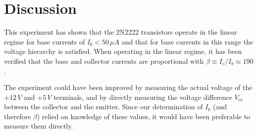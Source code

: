 \documentclass[aps,prl,twocolumn,groupedaddress]{revtex4}
\begin{document}
\section{Discussion}

This experiment has shown that the 2N2222 transistors operate in the linear regime for base currents of $I_b < 50 \, \mu A$ and that for base currents in this range the voltage hierarchy is satisfied.  When operating in the linear regime, it has been verified that the base and collector currents are proportional with $\beta \equiv I_c/I_b \approx 190$.  

The experiment could have been improved by measuring the actual voltage of the $+12 \, V$ and $+5 \, V$ terminals, and by directly measuring the voltage difference $V_{ce}$ between the collector and the emitter. Since our determination of $I_b$ (and therefore $\beta$) relied on knowledge of these values, it would have been preferable to measure them directly.

\vfill



\end{document}
